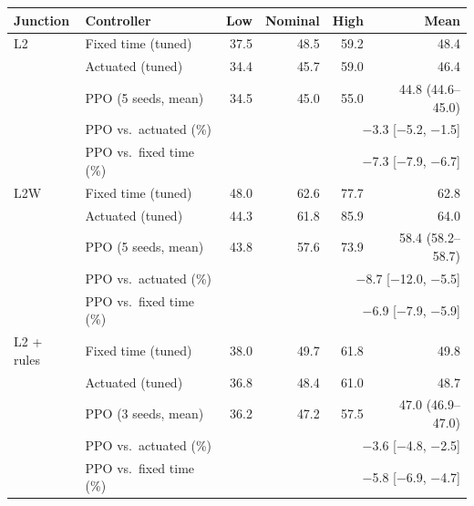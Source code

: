 \begin{tabular}{llrrrr}
\toprule
Junction & Controller & Low & Nominal & High & Mean \\
\midrule
L2 & Fixed time (tuned) & 37.5 & 48.5 & 59.2 & 48.4 \\
 & Actuated (tuned) & 34.4 & 45.7 & 59.0 & 46.4 \\
 & PPO (5 seeds, mean) & 34.5 & 45.0 & 55.0 & 44.8 (44.6--45.0) \\
 & PPO vs.\ actuated (\%) & \multicolumn{4}{r}{$-$3.3 [$-$5.2, $-$1.5]} \\
 & PPO vs.\ fixed time (\%) & \multicolumn{4}{r}{$-$7.3 [$-$7.9, $-$6.7]} \\
\midrule
L2W & Fixed time (tuned) & 48.0 & 62.6 & 77.7 & 62.8 \\
 & Actuated (tuned) & 44.3 & 61.8 & 85.9 & 64.0 \\
 & PPO (5 seeds, mean) & 43.8 & 57.6 & 73.9 & 58.4 (58.2--58.7) \\
 & PPO vs.\ actuated (\%) & \multicolumn{4}{r}{$-$8.7 [$-$12.0, $-$5.5]} \\
 & PPO vs.\ fixed time (\%) & \multicolumn{4}{r}{$-$6.9 [$-$7.9, $-$5.9]} \\
\midrule
L2 + rules & Fixed time (tuned) & 38.0 & 49.7 & 61.8 & 49.8 \\
 & Actuated (tuned) & 36.8 & 48.4 & 61.0 & 48.7 \\
 & PPO (3 seeds, mean) & 36.2 & 47.2 & 57.5 & 47.0 (46.9--47.0) \\
 & PPO vs.\ actuated (\%) & \multicolumn{4}{r}{$-$3.6 [$-$4.8, $-$2.5]} \\
 & PPO vs.\ fixed time (\%) & \multicolumn{4}{r}{$-$5.8 [$-$6.9, $-$4.7]} \\
\bottomrule
\end{tabular}
